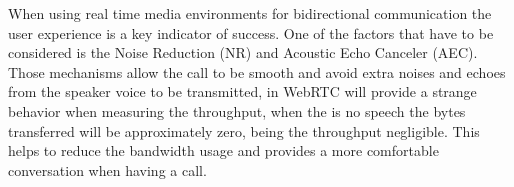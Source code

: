 When using real time media environments for bidirectional communication the user experience is a key indicator of success. One of the factors that have to be considered is the Noise Reduction (NR) and Acoustic Echo Canceler (AEC). Those mechanisms allow the call to be smooth and avoid extra noises and echoes from the speaker voice to be transmitted, in WebRTC will provide a strange behavior when measuring the throughput, when the is no speech the bytes transferred will be approximately zero, being the throughput negligible. This helps to reduce the bandwidth usage and provides a more comfortable conversation when having a call.

